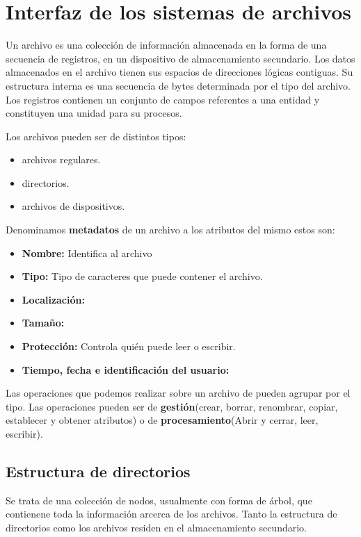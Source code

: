 \section*{Interfaz de los sistemas de archivos}

Un archivo es una colección de información almacenada en la forma de una secuencia de registros, en un dispositivo de almacenamiento secundario. Los datos almacenados en el archivo tienen sus espacios de direcciones lógicas contiguas. Su estructura interna es una secuencia de bytes determinada por el tipo del archivo. Los registros contienen un conjunto de campos referentes a una entidad y constituyen una unidad para su procesos.

Los archivos pueden ser de distintos tipos:

\begin{itemize}
	\item archivos regulares.
	\item directorios.
	\item archivos de dispositivos.
\end{itemize}

Denominamos \textbf{metadatos} de un archivo a los atributos del mismo estos son:

\begin{itemize}
	\item\textbf{Nombre:} Identifica al archivo
	\item\textbf{Tipo:} Tipo de caracteres que puede contener el archivo.
	\item\textbf{Localización:}
	\item\textbf{Tamaño:}
	\item\textbf{Protección:} Controla quién puede leer o escribir.
	\item\textbf{Tiempo, fecha e identificación del usuario:}
\end{itemize}

Las operaciones que podemos realizar sobre un archivo de pueden agrupar por el tipo. Las operaciones pueden ser de \textbf{gestión}(crear, borrar, renombrar, copiar, establecer y obtener atributos) o de \textbf{procesamiento}(Abrir y cerrar, leer, escribir).

\subsection*{Estructura de directorios}

Se trata de una colección de nodos, usualmente con forma de árbol, que contienene toda la información arcerca de los archivos. Tanto la estructura de directorios como los archivos residen en el almacenamiento secundario.

